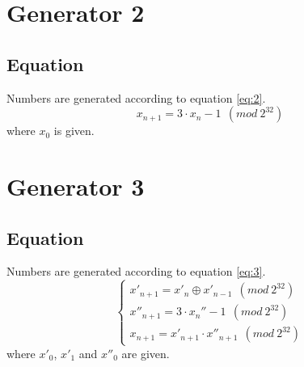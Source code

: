 \documentclass[a4paper,10pt]{article}
\begin{document}
\section{Generator 2}
\subsection{Equation}
Numbers are generated according to equation \ref{eq:2}.
\begin{equation}
\label{eq:2}
  x_{n+1} = 3 \cdot x_n - 1\ \ (mod\ 2^{32}) 
\end{equation}
where ${x_0}$ is given.





\section{Generator 3}
\subsection{Equation}
Numbers are generated according to equation \ref{eq:3}.
\begin{equation}
\label{eq:3}
\begin{cases}
x'_{n+1} = x'_n \oplus x'_{n-1}\ \ (mod\ 2^{32}) \\ x''_{n+1} = 3 \cdot x_n'' - 1\ \ (mod\ 2^{32}) \\ x_{n+1} = x'_{n+1} \cdot x''_{n+1}\ \ (mod\ 2^{32})
\end{cases}
\end{equation}
where ${x'_0}$, ${x'_1}$ and ${x''_0}$ are given.
\end{document}
